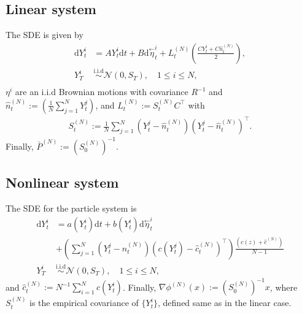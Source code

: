 \documentclass[letterpaper, 10 pt, conference]{ieeeconf}  %
\newcommand{\tp}{^\top}
\newcommand{\inv}{^{-1}}
\newcommand{\ud}{\mathrm{d}}
\newcommand{\grad}{\nabla}
\newcommand{\backward}[1]{\overset{\leftarrow}{#1}}
\begin{document}
\subsection{Linear system}
\label{app:linenkf}
The SDE \cite[Section 2]{joshi-2022} is given by
\begin{align*}
\ud {Y}^i_t &= {A {Y}^i_t \ud t + B\ud \backward{\eta}^i_t } + 
L^{(N)}_t \left(\frac{C{Y}^i_t+ C\hat{n}^{(N)}_t}{2} \right), \\ 
{Y}^i_T  &\stackrel{\text{i.i.d}}{\sim} \mathcal
N(0,S_T),\quad 1\leq i\leq N, \\
\end{align*}
${\eta}^i$ are an i.i.d Brownian motions with covariance $R\inv$ and $\hat{n}^{(N)}_t := \left( \frac{1}{N} \sum_{j=1}^{N} Y_t^j \right) $, and $L_t^{(N)} := S_t^{(N)}C\tp$ with
\begin{align*}
S^{(N)}_t := \frac{1}{N} \sum_{j=1}^{N} ({Y}_t^j - \hat{n}_t^{(N)}) ({Y}_t^j - \hat{n}_t^{(N)})\tp. 
\end{align*}
Finally, $\bar{P}^{(N)} := (S^{(N)}_0)\inv$.

\subsection{Nonlinear system}
\label{app:nlenkf}
The SDE \cite[Section 3]{joshi-2022} for the particle system is
\begin{align*}
\ud {Y}^i_t &= {a ({ Y}^i_t)\ud t +  b ({ Y}^i_t) \ud \backward{\eta}^i_t}  
 \\
 &+ \left(\sum_{j=1}^{N}(Y_t^j - n^{(N)}_t )(c({ Y}^j_t) - \hat{c}_t^{(N)}  )^\top\right) \frac{(c(z) + \hat{c}^{(N)})}{N-1} \\
{Y}^i_T  &\stackrel{\text{i.i.d}}{\sim} \mathcal
N(0,S_T),\quad 1\leq i\leq N, 
\end{align*}
and $\hat{c}^{(N)}_{t} := N^{-1} \sum_{i=1}^N c(Y^i_{t})$. Finally, $\grad\phi^{(N)}(x) := (S^{(N)}_0)\inv x$, where $S^{(N)}_t$ is the empirical covariance of $\{Y_t^i\}$, defined same as in the linear case. 
\end{document}
